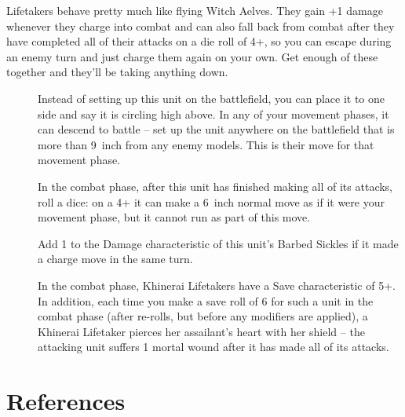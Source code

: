 Lifetakers behave pretty much like flying Witch Aelves. They gain +1 damage
whenever they charge into combat and can also fall back from combat after they
have completed all of their attacks on a die roll of 4+, so you can escape
during an enemy turn and just charge them again on your own. Get enough of
these together and they'll be taking anything down.
\begin{description}
    \item [] Instead of setting
        up this unit on the battlefield, you can place it to one side and say
        it is circling high above. In any of your movement phases, it can
        descend to battle – set up the unit anywhere on the battlefield that is
        more than 9~inch from any enemy models. This is their move for that
        movement phase.
    \item [] In the combat phase,
        after this unit has finished making all of its attacks, roll a dice: on
        a 4+ it can make a 6~inch normal move as if it were your movement
        phase, but it cannot run as part of this move.
    \item [] 
        Add 1 to the Damage characteristic of this unit’s
        Barbed Sickles if it made a charge move in the same turn.
    \item [] In the combat
        phase, Khinerai Lifetakers have a Save characteristic of 5+. In
        addition, each time you make a save roll of 6 for such a unit in the
        combat phase (after re-rolls, but before any modifiers are applied),
        a Khinerai Lifetaker pierces her assailant’s heart with her shield
        -- the attacking unit suffers 1 mortal wound after it has made all of
        its attacks.
\end{description}



\section{References}
